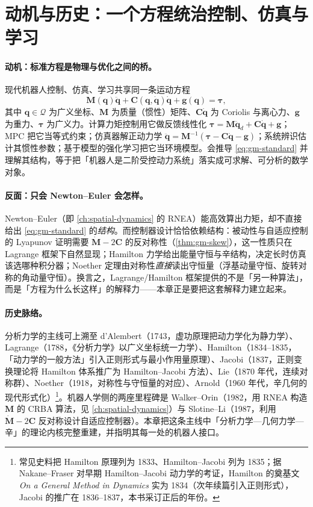 \section{动机与历史：一个方程统治控制、仿真与学习}
\label{sec:gm-history}

\paragraph{动机：标准方程是物理与优化之间的桥。}
现代机器人控制、仿真、学习共享同一条运动方程
\begin{equation}
  \mathbf M(\mathbf q)\ddot{\mathbf q}+\mathbf C(\mathbf q,\dot{\mathbf q})\dot{\mathbf q}+\mathbf g(\mathbf q)=\boldsymbol\tau,
  \label{eq:gm-standard}
\end{equation}
其中 $\mathbf q\in\mathcal Q$ 为广义坐标、$\mathbf M$ 为质量（惯性）矩阵、$\mathbf C\dot{\mathbf q}$ 为 Coriolis 与离心力、$\mathbf g$ 为重力、$\boldsymbol\tau$ 为广义力。计算力矩控制用它做反馈线性化 $\boldsymbol\tau=\mathbf M\ddot{\mathbf q}_d+\mathbf C\dot{\mathbf q}+\mathbf g$；MPC 把它当等式约束；仿真器解正动力学 $\ddot{\mathbf q}=\mathbf M^{-1}(\boldsymbol\tau-\mathbf C\dot{\mathbf q}-\mathbf g)$；系统辨识估计其惯性参数；基于模型的强化学习把它当环境模型。会推导 \cref{eq:gm-standard} 并理解其结构，等于把「机器人是二阶受控动力系统」落实成可求解、可分析的数学对象。

\paragraph{反面：只会 Newton--Euler 会怎样。}
Newton--Euler（即 \cref{ch:spatial-dynamics} 的 RNEA）能高效算出力矩，却不直接给出 \cref{eq:gm-standard} 的\emph{结构}。而控制器设计恰恰依赖结构：被动性与自适应控制的 Lyapunov 证明需要 $\dot{\mathbf M}-2\mathbf C$ 的反对称性（\cref{thm:gm-skew}），这一性质只在 Lagrange 框架下自然显现；Hamilton 力学给出能量守恒与辛结构，决定长时仿真该选哪种积分器；Noether 定理由对称性\emph{直接}读出守恒量（浮基动量守恒、旋转对称的角动量守恒）。换言之，Lagrange/Hamilton 框架提供的不是「另一种算法」，而是「方程为什么长这样」的解释力——本章正是要把这套解释力建立起来。

\paragraph{历史脉络。}
分析力学的主线可上溯至 d'Alembert（1743，虚功原理把动力学化为静力学）、Lagrange（1788，《分析力学》以广义坐标统一力学）、Hamilton（1834--1835，「动力学的一般方法」引入正则形式与最小作用量原理）、Jacobi（1837，正则变换理论将 Hamilton 体系推广为 Hamilton--Jacobi 方法）、Lie（1870 年代，连续对称群）、Noether（1918，对称性与守恒量的对应）、Arnold（1960 年代，辛几何的现代形式化）\footnote{常见史料把 Hamilton 原理列为 1833、Hamilton--Jacobi 列为 1835；据 Nakane--Fraser 对早期 Hamilton--Jacobi 动力学的考证，Hamilton 的奠基文 \emph{On a General Method in Dynamics} 实为 1834（次年续篇引入正则形式），Jacobi 的推广在 1836--1837，本书采订正后的年份。}。机器人学侧的两座里程碑是 Walker--Orin（1982，用 RNEA 构造 $\mathbf M$ 的 CRBA 算法，见 \cref{ch:spatial-dynamics}）与 Slotine--Li（1987，利用 $\dot{\mathbf M}-2\mathbf C$ 反对称设计自适应控制器\cite{slotine1987adaptive}）。本章把这条主线中「分析力学—几何力学—辛」的理论内核完整重建，并指明其每一处的机器人接口。

